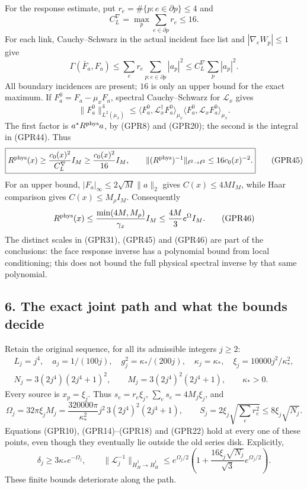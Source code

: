 \documentclass[11pt]{article}
\begin{document}
For the response estimate, put \(r_e=\#\{p:e\in\partial p\}\le4\) and
\[
 C_L^{\nabla}=\max_p\sum_{e\in\partial p}r_e\le16.
 \tag{GPR43}
\]
For each link, Cauchy–Schwarz in the actual incident face list and \(|\nabla_eW_p|\le1\) give
\[
 \Gamma(\bar F_a,F_a)\le\sum_er_e\sum_{p:e\in\partial p}|a_p|^2
 \le C_L^{\nabla}\sum_p|a_p|^2.
 \tag{GPR44}
\]
All boundary incidences are present; \(16\) is only an upper bound for the exact maximum. If \(F_a^0=F_a-\mu_xF_a\), spectral Cauchy–Schwarz for \(\mathcal L_x\) gives
\[
 \|F_a^0\|_{L^2(\mu_x)}^4
 \le\langle F_a^0,\mathcal L_x^\dagger F_a^0\rangle_{\mu_x}
       \langle F_a^0,\mathcal L_xF_a^0\rangle_{\mu_x}.
\]
The first factor is \(a^*R^{\rm phys}a\), by (GPR8) and (GPR20); the second is the integral in (GPR44). Thus
\[
 \boxed{R^{\rm phys}(x)\ge\frac{c_0(x)^2}{C_L^{\nabla}}I_M
          \ge\frac{c_0(x)^2}{16}I_M,\qquad
 \|(R^{\rm phys})^{-1}\|_{\ell^2\to\ell^2}
          \le16c_0(x)^{-2}.}
 \tag{GPR45}
\]
For an upper bound, \(|F_a|_\infty\le2\sqrt M\|a\|_2\) gives \(C(x)\le4MI_M\), while Haar comparison gives \(C(x)\le M_\rho I_M\). Consequently
\[
 R^{\rm phys}(x)\le\frac{\min(4M,M_\rho)}{\gamma_x}I_M
 \le\frac{4M}{3}e^\Omega I_M.
 \tag{GPR46}
\]
The distinct scales in (GPR31), (GPR45) and (GPR46) are part of the conclusions: the face response inverse has a polynomial bound from local conditioning; this does not bound the full physical spectral inverse by that same polynomial.

\subsection*{6. The exact joint path and what the bounds decide}

Retain the original sequence, for all its admissible integers \(j\ge2\):
\[
\begin{gathered}
 L_j=j^4,\quad a_j=1/(100j),\quad g_j^2=\kappa_*/(200j),\quad
 \kappa_j=\kappa_*,\quad \xi_j=10000j^2/\kappa_*^2,\\
 N_j=3(2j^4)(2j^4+1)^2,\qquad
 M_j=3(2j^4)^2(2j^4+1),\qquad\kappa_*>0.
\end{gathered}\tag{GPR47}
\]
Every source is \(x_p=\xi_j\). Thus \(s_e=r_e\xi_j\), \(\sum_es_e=4M_j\xi_j\), and
\[
 \Omega_j=32\pi\xi_jM_j
 =\frac{320000\pi}{\kappa_*^2}j^2\,3(2j^4)^2(2j^4+1),\qquad
 S_j=2\xi_j\sqrt{\sum_er_e^2}\le8\xi_j\sqrt{N_j}.
 \tag{GPR48}
\]
Equations (GPR10), (GPR14)–(GPR18) and (GPR22) hold at every one of these points, even though they eventually lie outside the old series disk. Explicitly,
\[
 \delta_j\ge3\kappa_*e^{-\Omega_j},\qquad
 \|\mathscr L_j^{-1}\|_{\dot H^1_H\to\dot H^1_H}
 \le e^{\Omega_j/2}
       \left(1+\frac{16\xi_j\sqrt{N_j}}{\sqrt3}e^{\Omega_j/2}\right).
 \tag{GPR49}
\]
These finite bounds deteriorate along the path.
\end{document}
